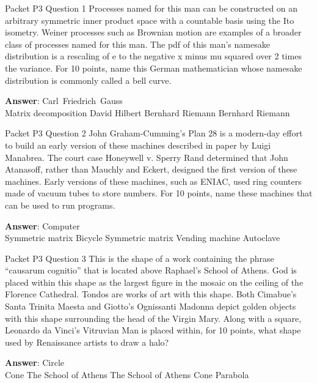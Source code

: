 \begin{frame}{Packet P3 Question 1}
Processes named for this   man can be constructed on an arbitrary symmetric inner product space with a countable basis using   the Ito isometry. Weiner processes such as Brownian motion are examples of a broader class of processes named for this man. The pdf of this man's namesake distribution is a rescaling of e to the negative x minus mu squared over 2 times the variance. For 10 points, name this German mathematician whose   namesake distribution is commonly called   a bell curve.    

\textbf{Answer}: Carl\ Friedrich\ Gauss\\
 Matrix decomposition
 David Hilbert
 Bernhard Riemann
 Bernhard Riemann
\end{frame}

\begin{frame}{Packet P3 Question 2}
John   Graham-Cumming's Plan 28 is a modern-day effort to build an early version of these machines described in paper by Luigi Manabrea. The court case Honeywell v. Sperry Rand determined that John Atanasoff, rather than Mauchly and Eckert, designed the first version of these machines. Early versions of these machines, such as ENIAC, used ring counters made of vacuum tubes to store numbers. For 10 points, name these machines that can be used to run programs.        

\textbf{Answer}: Computer\\
 Symmetric matrix
 Bicycle
 Symmetric matrix
 Vending machine
 Autoclave
\end{frame}

\begin{frame}{Packet P3 Question 3}
This is the shape of a   work containing the phrase ``causarum cognitio''     that is located above Raphael's School of Athens. God is placed within this shape as the largest figure in the mosaic on the ceiling of the Florence Cathedral. Tondos are works of art with this shape. Both Cimabue's Santa Trinita Maesta and Giotto's Ognissanti Madonna depict golden objects with this shape surrounding the head of the Virgin Mary. Along with a square, Leonardo da Vinci's Vitruvian Man is placed within, for 10 points, what shape used by Renaissance artists to draw a halo?      

\textbf{Answer}: Circle\\
 Cone
 The School of Athens
 The School of Athens
 Cone
 Parabola
\end{frame}

